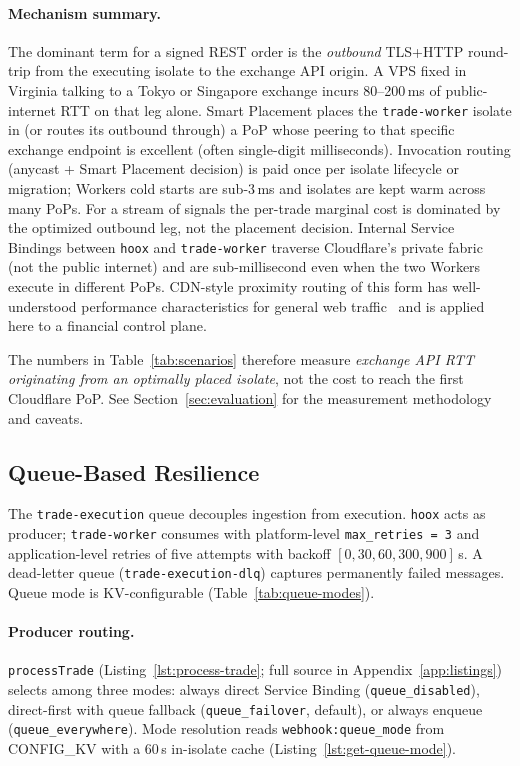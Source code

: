 \paragraph{Mechanism summary.} The dominant term for a signed REST order is the \emph{outbound} TLS+HTTP round-trip from the executing isolate to the exchange API origin. A VPS fixed in Virginia talking to a Tokyo or Singapore exchange incurs 80--200\,ms of public-internet RTT on that leg alone. Smart Placement places the \texttt{trade-worker} isolate in (or routes its outbound through) a PoP whose peering to that specific exchange endpoint is excellent (often single-digit milliseconds). Invocation routing (anycast + Smart Placement decision) is paid once per isolate lifecycle or migration; Workers cold starts are sub-3\,ms and isolates are kept warm across many PoPs. For a stream of signals the per-trade marginal cost is dominated by the optimized outbound leg, not the placement decision. Internal Service Bindings between \texttt{hoox} and \texttt{trade-worker} traverse Cloudflare's private fabric (not the public internet) and are sub-millisecond even when the two Workers execute in different PoPs. CDN-style proximity routing of this form has well-understood performance characteristics for general web traffic~\cite{nygren2010akamai,singh2015jupiter} and is applied here to a financial control plane.

The numbers in Table~\ref{tab:scenarios} therefore measure \emph{exchange API RTT originating from an optimally placed isolate}, not the cost to reach the first Cloudflare PoP. See Section~\ref{sec:evaluation} for the measurement methodology and caveats.

\subsection{Queue-Based Resilience}

The \texttt{trade-execution} queue decouples ingestion from execution. \texttt{hoox} acts as producer; \texttt{trade-worker} consumes with platform-level \texttt{max\_retries = 3} and application-level retries of five attempts with backoff $[0, 30, 60, 300, 900]$\,s. A dead-letter queue (\texttt{trade-execution-dlq}) captures permanently failed messages. Queue mode is KV-configurable (Table~\ref{tab:queue-modes}).

\paragraph{Producer routing.} \texttt{processTrade} (Listing~\ref{lst:process-trade}; full source in Appendix~\ref{app:listings}) selects among three modes: always direct Service Binding (\texttt{queue\_disabled}), direct-first with queue fallback (\texttt{queue\_failover}, default), or always enqueue (\texttt{queue\_everywhere}). Mode resolution reads \texttt{webhook:queue\_mode} from CONFIG\_KV with a 60\,s in-isolate cache (Listing~\ref{lst:get-queue-mode}).

